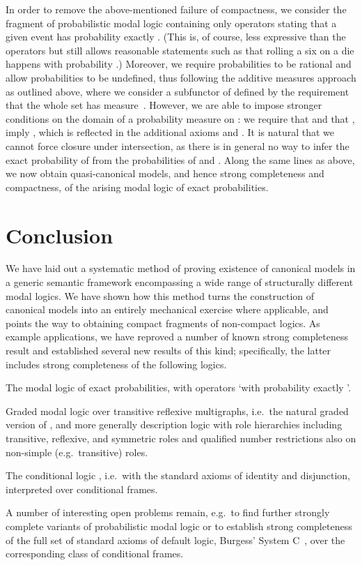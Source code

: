 \documentclass[proceedings]{stacs}
\theoremstyle{definition}
\theoremstyle{plain}
\newenvironment{sparitemize}
{\begin{list}{}{
    \setlength{\leftmargin}{0pt}
    \setlength{\parsep}{0pt}
    \setlength{\itemindent}{4ex}
    \setlength{\itemsep}{0pt}
  }
}{\end{list}}
\begin{document}
\newcommand{\PMLe}{\mathrm{PML}_e}
\begin{exa}
In order to remove the above-mentioned failure of compactness, we
consider the fragment of probabilistic modal logic containing only
operators  stating that a given event has probability exactly
. (This is, of course, less expressive than the operators  but
still allows reasonable statements such as that rolling a six on a die
happens with probability .) Moreover, we require probabilities to
be rational and allow probabilities to be undefined, thus following
the additive measures approach as outlined above, where we consider a
subfunctor of  defined by the requirement that the
whole set has measure~. However, we are able to impose stronger
conditions on the domain  of a probability
measure  on : we require that  and that ,
 imply , which is reflected in the additional
axioms  and . It is natural that we cannot force closure
under intersection, as there is in general no way to infer the exact
probability of  from the probabilities of  and .
Along the same lines as above, we now obtain quasi-canonical models,
and hence strong completeness and compactness, of the arising modal
logic of exact probabilities.

\end{exa}




\section{Conclusion}

\noindent We have laid out a systematic method of proving existence of
canonical models in a generic semantic framework encompassing a wide
range of structurally different modal logics. We have shown how this
method turns the construction of canonical models into an entirely
mechanical exercise where applicable, and points the way to obtaining
compact fragments of non-compact logics. As example applications, we
have reproved a number of known strong completeness result and
established several new results of this kind; specifically, the latter
includes strong completeness of the following logics.
\begin{sparitemize}
\item The modal logic of exact probabilities, with operators 
  `with probability exactly '.
\item Graded modal logic over transitive reflexive multigraphs, i.e.\
  the natural graded version of , and more generally description
  logic with role hierarchies including transitive, reflexive, and
  symmetric roles and qualified number restrictions also on non-simple
  (e.g.\ transitive) roles.
\item The conditional logic , i.e.\ with the
  standard axioms of identity and disjunction, interpreted over
  conditional frames.
\end{sparitemize}
A number of interesting open problems remain, e.g.\ to find further
strongly complete variants of probabilistic modal logic or to
establish strong completeness of the full set of standard axioms of
default logic, Burgess' System C~\cite{Burgess81}, over the
corresponding class of conditional frames.
\end{document}
